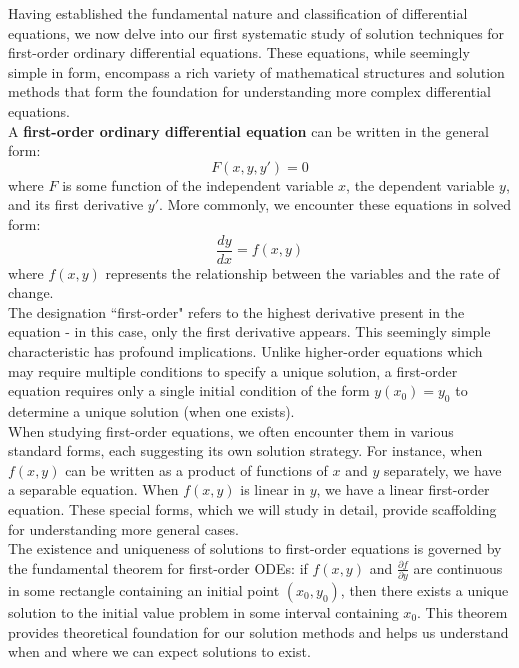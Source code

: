 \newpage

 

\noindent Having established the fundamental nature and classification of differential equations, we now delve into our first systematic study of solution techniques for first-order ordinary differential equations. These equations, while seemingly simple in form, encompass a rich variety of mathematical structures and solution methods that form the foundation for understanding more complex differential equations. \\

\noindent A \textbf{first-order ordinary differential equation} can be written in the general form:
\[
F(x, y, y') = 0
\]
where $F$ is some function of the independent variable $x$, the dependent variable $y$, and its first derivative $y'$. More commonly, we encounter these equations in solved form:
\[
\frac{dy}{dx} = f(x,y)
\]
where $f(x,y)$ represents the relationship between the variables and the rate of change. \\

\noindent The designation ``first-order" refers to the highest derivative present in the equation - in this case, only the first derivative appears. This seemingly simple characteristic has profound implications. Unlike higher-order equations which may require multiple conditions to specify a unique solution, a first-order equation requires only a single initial condition of the form $y(x_0) = y_0$ to determine a unique solution (when one exists). \\

\noindent When studying first-order equations, we often encounter them in various standard forms, each suggesting its own solution strategy. For instance, when $f(x,y)$ can be written as a product of functions of $x$ and $y$ separately, we have a separable equation. When $f(x,y)$ is linear in $y$, we have a linear first-order equation. These special forms, which we will study in detail, provide scaffolding for understanding more general cases. \\

\noindent The existence and uniqueness of solutions to first-order equations is governed by the fundamental theorem for first-order ODEs: if $f(x,y)$ and $\frac{\partial f}{\partial y}$ are continuous in some rectangle containing an initial point $(x_0, y_0)$, then there exists a unique solution to the initial value problem in some interval containing $x_0$. This theorem provides theoretical foundation for our solution methods and helps us understand when and where we can expect solutions to exist.

